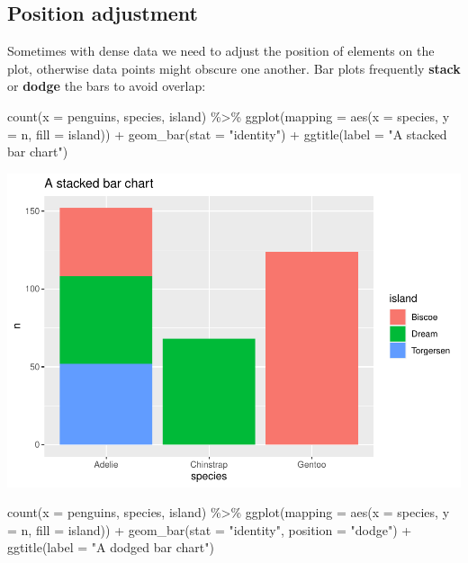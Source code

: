 \documentclass[
]{article}
\newenvironment{Shaded}{\begin{snugshade}}{\end{snugshade}}
\newcommand{\AttributeTok}[1]{\textcolor[rgb]{0.77,0.63,0.00}{#1}}
\newcommand{\FunctionTok}[1]{\textcolor[rgb]{0.00,0.00,0.00}{#1}}
\newcommand{\NormalTok}[1]{#1}
\newcommand{\SpecialCharTok}[1]{\textcolor[rgb]{0.00,0.00,0.00}{#1}}
\newcommand{\StringTok}[1]{\textcolor[rgb]{0.31,0.60,0.02}{#1}}
\begin{document}
\hypertarget{position-adjustment}{%
\subsection{Position adjustment}\label{position-adjustment}}

Sometimes with dense data we need to adjust the position of elements on
the plot, otherwise data points might obscure one another. Bar plots
frequently \textbf{stack} or \textbf{dodge} the bars to avoid overlap:

\begin{Shaded}
\begin{Highlighting}[]
\FunctionTok{count}\NormalTok{(}\AttributeTok{x =}\NormalTok{ penguins, species, island) }\SpecialCharTok{\%\textgreater{}\%}
  \FunctionTok{ggplot}\NormalTok{(}\AttributeTok{mapping =} \FunctionTok{aes}\NormalTok{(}\AttributeTok{x =}\NormalTok{ species, }\AttributeTok{y =}\NormalTok{ n, }\AttributeTok{fill =}\NormalTok{ island)) }\SpecialCharTok{+}
  \FunctionTok{geom\_bar}\NormalTok{(}\AttributeTok{stat =} \StringTok{"identity"}\NormalTok{) }\SpecialCharTok{+}
  \FunctionTok{ggtitle}\NormalTok{(}\AttributeTok{label =} \StringTok{"A stacked bar chart"}\NormalTok{)}
\end{Highlighting}
\end{Shaded}

\includegraphics{Grammar-of-Graphics_files/figure-latex/geom_bar_position_stack_and_dodge-1.pdf}

\begin{Shaded}
\begin{Highlighting}[]
\FunctionTok{count}\NormalTok{(}\AttributeTok{x =}\NormalTok{ penguins, species, island) }\SpecialCharTok{\%\textgreater{}\%}
  \FunctionTok{ggplot}\NormalTok{(}\AttributeTok{mapping =} \FunctionTok{aes}\NormalTok{(}\AttributeTok{x =}\NormalTok{ species, }\AttributeTok{y =}\NormalTok{ n, }\AttributeTok{fill =}\NormalTok{ island)) }\SpecialCharTok{+}
  \FunctionTok{geom\_bar}\NormalTok{(}\AttributeTok{stat =} \StringTok{"identity"}\NormalTok{, }\AttributeTok{position =} \StringTok{"dodge"}\NormalTok{) }\SpecialCharTok{+}
  \FunctionTok{ggtitle}\NormalTok{(}\AttributeTok{label =} \StringTok{"A dodged bar chart"}\NormalTok{)}
\end{Highlighting}
\end{Shaded}
\end{document}
